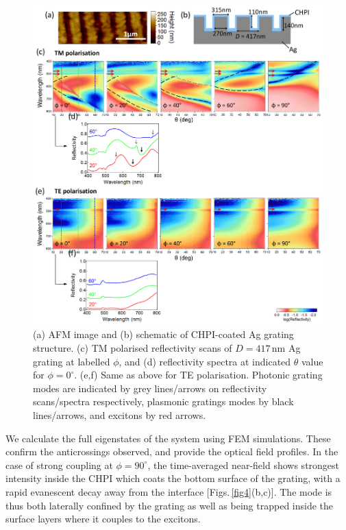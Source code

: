 \begin{figure}[ht] 
\centering    
\includegraphics[width=\textwidth]{Fig17}
\caption{(a) AFM image and (b) schematic of CHPI-coated Ag grating structure. (c) TM polarised reflectivity scans of $D=417$\,nm Ag grating at labelled $\phi$, and (d) reflectivity spectra at indicated $\theta$ value for $\phi=0^{\circ}$. (e,f) Same as above for TE polarisation. Photonic grating modes are indicated by grey lines/arrows on reflectivity scans/spectra respectively, plasmonic gratings modes by black lines/arrows, and excitons by red arrows.}
\label{7Fig17}
\end{figure}

We calculate the full eigenstates of the system using FEM simulations. These confirm the anticrossings observed, and provide the optical field profiles.
In the case of strong coupling at $\phi=90^{\circ}$, the time-averaged near-field shows strongest intensity inside the CHPI which coats the bottom surface of the grating, with a rapid evanescent decay away from the interface [Figs.\,\ref{fig4}(b,c)]. The mode is thus both laterally confined by the grating as well as being trapped inside the surface layers where it couples to the excitons.

